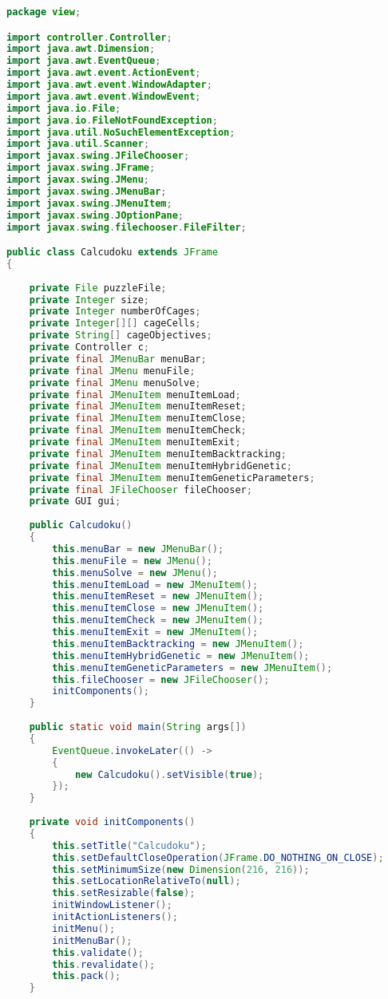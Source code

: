 \begin{lstlisting}[language=Java,basicstyle=\tiny,caption=Calcudoku.java]
package view;

import controller.Controller;
import java.awt.Dimension;
import java.awt.EventQueue;
import java.awt.event.ActionEvent;
import java.awt.event.WindowAdapter;
import java.awt.event.WindowEvent;
import java.io.File;
import java.io.FileNotFoundException;
import java.util.NoSuchElementException;
import java.util.Scanner;
import javax.swing.JFileChooser;
import javax.swing.JFrame;
import javax.swing.JMenu;
import javax.swing.JMenuBar;
import javax.swing.JMenuItem;
import javax.swing.JOptionPane;
import javax.swing.filechooser.FileFilter;

public class Calcudoku extends JFrame
{
    
    private File puzzleFile;
    private Integer size;
    private Integer numberOfCages;
    private Integer[][] cageCells;
    private String[] cageObjectives;
    private Controller c;
    private final JMenuBar menuBar;
    private final JMenu menuFile;
    private final JMenu menuSolve;
    private final JMenuItem menuItemLoad;
    private final JMenuItem menuItemReset;
    private final JMenuItem menuItemClose;
    private final JMenuItem menuItemCheck;
    private final JMenuItem menuItemExit;
    private final JMenuItem menuItemBacktracking;
    private final JMenuItem menuItemHybridGenetic;
    private final JMenuItem menuItemGeneticParameters;
    private final JFileChooser fileChooser;
    private GUI gui;
    
    public Calcudoku()
    {        
        this.menuBar = new JMenuBar();
        this.menuFile = new JMenu();
        this.menuSolve = new JMenu();
        this.menuItemLoad = new JMenuItem();
        this.menuItemReset = new JMenuItem();
        this.menuItemClose = new JMenuItem();
        this.menuItemCheck = new JMenuItem();
        this.menuItemExit = new JMenuItem();
        this.menuItemBacktracking = new JMenuItem();
        this.menuItemHybridGenetic = new JMenuItem();
        this.menuItemGeneticParameters = new JMenuItem();
        this.fileChooser = new JFileChooser();
        initComponents();
    }
    
    public static void main(String args[])
    {
        EventQueue.invokeLater(() ->
        {
            new Calcudoku().setVisible(true);
        });
    }
    
    private void initComponents()
    { 
        this.setTitle("Calcudoku");
        this.setDefaultCloseOperation(JFrame.DO_NOTHING_ON_CLOSE);
        this.setMinimumSize(new Dimension(216, 216));
        this.setLocationRelativeTo(null);
        this.setResizable(false);
        initWindowListener();
        initActionListeners();
        initMenu();
        initMenuBar();
        this.validate();
        this.revalidate();
        this.pack();
    }


\end{lstlisting}

